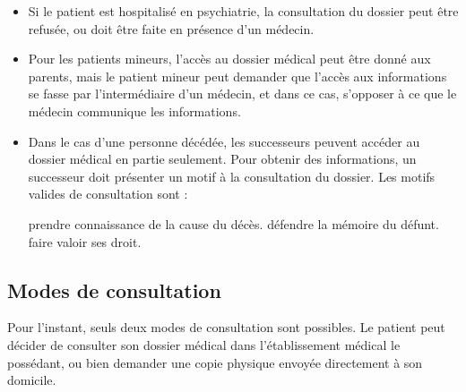 \begin{itemize}

    \item Si le patient est hospitalisé en psychiatrie, la consultation du dossier peut être
refusée, ou doit être faite en présence d'un médecin.

\item Pour les patients mineurs, l'accès au dossier médical peut être donné aux parents,
mais le patient mineur peut demander que l'accès aux informations se fasse par
l'intermédiaire d'un médecin, et dans ce cas, s'opposer à ce que le médecin communique les informations.

\item Dans le cas d'une personne décédée, les successeurs peuvent accéder au dossier médical
en partie seulement. Pour obtenir des informations, un successeur doit présenter un motif
à la consultation du dossier. Les motifs valides de consultation sont :

    \subitem prendre connaissance de la cause du décès.
    \subitem défendre la mémoire du défunt.
    \subitem faire valoir ses droit.

\end{itemize}


\subsection{Modes de consultation}

Pour l'instant, seuls deux modes de consultation sont possibles. Le patient peut décider de
consulter son dossier médical dans l'établissement médical le possédant, ou bien demander 
une copie physique envoyée directement à son domicile.


